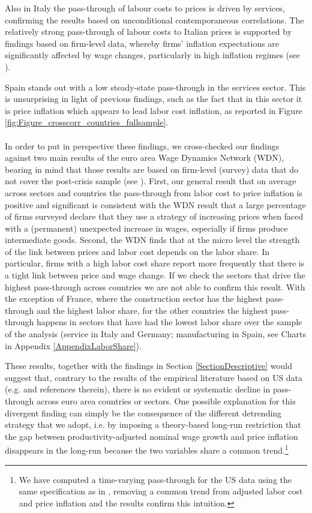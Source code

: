 \documentclass[11pt]{article}
\begin{document}
Also in Italy the pass-through of labour costs to prices is driven by services, confirming the results based on unconditional contemporaneous correlations. The relatively strong pass-through of labour costs to Italian prices is supported by findings based on firm-level data, whereby firms’ inflation expectations are significantly affected by wage changes, particularly in high inflation regimes (see \cite{Conflitti_Zizza_18}). 

Spain stands out with a low steady-state pass-through in the services sector. This is unsurprising in light of previous findings, such as the fact that in this sector it is price inflation which appears to lead labor cost inflation, as reported in Figure \ref{fig:Figure_crosscorr_countries_fullsample}.\\ 
\\
In order to put in perspective these findings, we cross-checked our findings against two main results of the euro area Wage Dynamics Network (WDN), bearing in mind that those results are based on firm-level (survey) data that do not cover the post-crisis sample (see \cite{ECB2009}). First, our general result that on average across sectors and countries the pass-through from labor cost to price inflation is positive and significant is consistent with the WDN result that a large percentage of firms surveyed declare that they use a strategy of increasing prices when faced with a (permanent) unexpected increase in wages, especially if firms produce intermediate goods. Second, the WDN finds that at the micro level the strength of the link between prices and labor cost depends on the labor share. In particular, firms with a high labor cost share report more frequently that there is a tight link between price and wage change. If we check the sectors that drive the highest pass-through across countries we are not able to confirm this result. With the exception of France, where the construction sector has the highest pass-through and the highest labor share, for the other countries the highest pass-through happens in sectors that have had the lowest labor share over the sample of the analysis (service in Italy and Germany; manufacturing in Spain, see Charts in Appendix \ref{AppendixLaborShare}).

These results, together with the findings in Section \ref{SectionDescriptive} would suggest that, contrary to the results of the empirical literature based on US data (e.g. \cite{Peneva_Rudd_2017} and references therein), there is no evident or systematic decline in pass-through across euro area countries or sectors. One possible explanation for this divergent finding can simply be the consequence of the different detrending strategy that we adopt, i.e. by imposing a theory-based long-run restriction that the gap between productivity-adjusted nominal wage growth and price inflation disappears in the long-run because the two variables share a common trend.\footnote{We have computed a time-varying pass-through for the US data using the same specification as in \cite{Peneva_Rudd_2017}, removing a common trend from adjusted labor cost and price inflation and the results confirm this intuition.}
\end{document}
